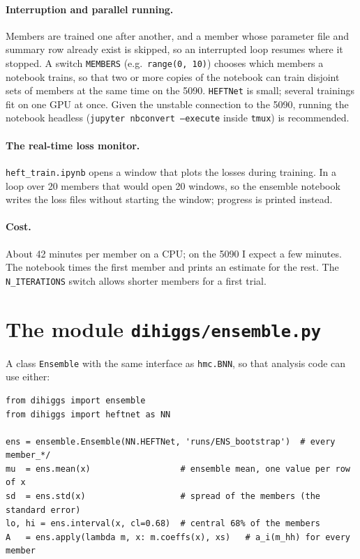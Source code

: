 \documentclass[11pt]{article}
\newcommand{\file}[1]{\nolinkurl{#1}}
\newcommand{\code}[1]{\texttt{#1}}
\begin{document}
\paragraph{Interruption and parallel running.} Members are trained one after another, and
a member whose parameter file and summary row already exist is skipped, so an interrupted
loop resumes where it stopped. A switch \code{MEMBERS} (e.g.\ \code{range(0, 10)})
chooses which members a notebook trains, so that two or more copies of the notebook can
train disjoint sets of members at the same time on the 5090. \code{HEFTNet} is small;
several trainings fit on one GPU at once. Given the unstable connection to the 5090,
running the notebook headless (\code{jupyter nbconvert --execute} inside \code{tmux}) is
recommended.

\paragraph{The real-time loss monitor.} \file{heft_train.ipynb} opens a window that plots
the losses during training. In a loop over 20 members that would open 20 windows, so the
ensemble notebook writes the loss files without starting the window; progress is printed
instead.

\paragraph{Cost.} About 42 minutes per member on a CPU; on the 5090 I expect a few minutes.
The notebook times the first member and prints an estimate for the rest. The
\code{N\_ITERATIONS} switch allows shorter members for a first trial.

\section{The module \texttt{dihiggs/ensemble.py}}
\label{sec:module}

A class \code{Ensemble} with the same interface as \code{hmc.BNN}, so that analysis code
can use either:

\begin{lstlisting}
from dihiggs import ensemble
from dihiggs import heftnet as NN

ens = ensemble.Ensemble(NN.HEFTNet, 'runs/ENS_bootstrap')  # every member_*/
mu  = ens.mean(x)                  # ensemble mean, one value per row of x
sd  = ens.std(x)                   # spread of the members (the standard error)
lo, hi = ens.interval(x, cl=0.68)  # central 68% of the members
A   = ens.apply(lambda m, x: m.coeffs(x), xs)   # a_i(m_hh) for every member
\end{lstlisting}
\end{document}
